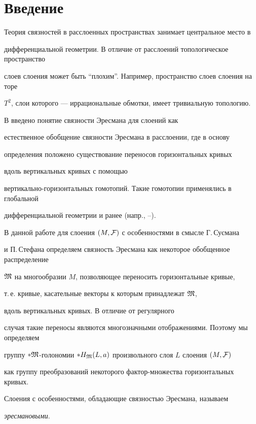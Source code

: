 \section*{Введение}





Теория связностей в расслоенных пространствах занимает центральное место в


дифференциальной геометрии. В отличие от расслоений топологическое пространство


слоев слоения может быть ``плохим''. Например, пространство слоев слоения на торе


$T^2$, слои которого --- иррациональные обмотки, имеет тривиальную топологию.


В \cite{BH} введено понятие связности Эресмана для слоений как


естественное обобщение связности Эресмана в расслоении, где в основу


определения положено существование переносов горизонтальных кривых 


вдоль вертикальных кривых с помощью


вертикально-горизонтальных гомотопий. Такие гомотопии применялись в глобальной


дифференциальной геометрии и ранее (напр., \cite{K}--\cite{ShZ}).





В данной работе для слоения $(M,\cal F)$ с особенностями в смысле Г.\,Сусмана \cite{Sus}


и П.\,Стефана \cite{St} определяем связность Эресмана как некоторое обобщенное распределение


$\frak M$ на многообразии $M$, позволяющее переносить горизонтальные кривые,


т.\,е. кривые, касательные векторы к которым принадлежат $\frak M$,


вдоль вертикальных кривых. В отличие от регулярного


случая такие переносы являются многозначными отображениями. Поэтому мы определяем


группу $*\frak M$-голономии $*H_{\frak M}(L,a)$ произвольного слоя $L$ слоения $(M,\cal F)$


как группу преобразований некоторого фактор-множества горизонтальных кривых.


Слоения с особенностями, обладающие связностью Эресмана, называем


{\it эресмановыми}.


